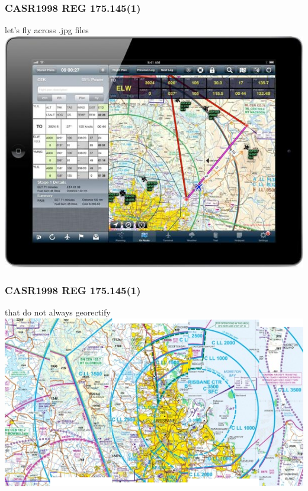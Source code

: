 \begin{frame}
\frametitle{CASR1998 REG 175.145(1)}
\begin{block}{let's fly across .jpg files}
\includegraphics[height=0.5\textheight]{image/avplan-screenshot.jpg}
\end{block}
\end{frame}

\begin{frame}
\frametitle{CASR1998 REG 175.145(1)}
\begin{block}{that do not always georectify}
\includegraphics[height=0.5\textheight]{image/vtc-georectification.png}
\end{block}
\end{frame}

